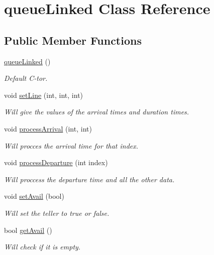 \hypertarget{classqueue_linked}{}\section{queue\+Linked Class Reference}
\label{classqueue_linked}
\subsection*{Public Member Functions}
\begin{DoxyCompactItemize}
\item 
\mbox{\hyperlink{classqueue_linked_a3c940956f0ad6b1f10d213860ac6b19d}{queue\+Linked}} ()
\begin{DoxyCompactList}\small\item\em Default C-\/tor. \end{DoxyCompactList}\item 
void \mbox{\hyperlink{classqueue_linked_aae8edd6c0b29eb247ff3f8f296c0f357}{set\+Line}} (int, int, int)
\begin{DoxyCompactList}\small\item\em Will give the values of the arrival times and duration times. \end{DoxyCompactList}\item 
void \mbox{\hyperlink{classqueue_linked_a349d8f2de3ef18dd6668e4660b4e2aec}{process\+Arrival}} (int, int)
\begin{DoxyCompactList}\small\item\em Will procces the arrival time for that index. \end{DoxyCompactList}\item 
void \mbox{\hyperlink{classqueue_linked_a7d50b634bcfef6b6128799e4b80275e5}{process\+Departure}} (int index)
\begin{DoxyCompactList}\small\item\em Will proccess the departure time and all the other data. \end{DoxyCompactList}\item 
void \mbox{\hyperlink{classqueue_linked_a26a7a4d03d8a4946b980d1d130799704}{set\+Avail}} (bool)
\begin{DoxyCompactList}\small\item\em Will set the teller to true or false. \end{DoxyCompactList}\item 
bool \mbox{\hyperlink{classqueue_linked_ade8a9e0f04a4c28bc0d5683493ea949b}{get\+Avail}} ()
\begin{DoxyCompactList}\small\item\em Will check if it is empty. \end{DoxyCompactList}\item 

\end{DoxyCompactItemize}

